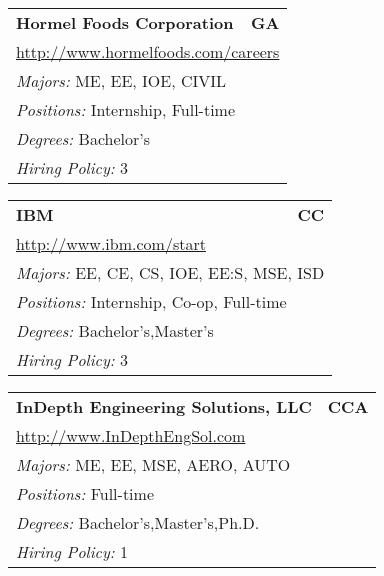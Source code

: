\documentclass[twoside]{article}
\begin{document}
\begin{center}
\begin{multicols}{3}
\begin{FlushLeft}
\begin{minipage}{\columnwidth}
\end{minipage}
 
\begin{minipage}{\columnwidth}\begin{tabularx}{.95\columnwidth}{Xr}
                 {\Large\bf Hormel Foods Corporation} & {\Large\bf GA}\\
    \multicolumn{2}{p{.95\columnwidth}}{\url{http://www.hormelfoods.com/careers}}\\
    \multicolumn{2}{p{.95\columnwidth}}{\emph{Majors:} ME, EE, IOE, CIVIL}\\
    \multicolumn{2}{p{.95\columnwidth}}{\emph{Positions:} Internship, Full-time}\\
    \multicolumn{2}{p{.95\columnwidth}}{\emph{Degrees:} Bachelor's}\\
    \multicolumn{2}{p{.95\columnwidth}}{\emph{Hiring Policy:} 3}\\
    \end{tabularx}
    
\end{minipage}
 
\begin{minipage}{\columnwidth}\begin{tabularx}{.95\columnwidth}{Xr}
                 {\Large\bf IBM} & {\Large\bf CC}\\
    \multicolumn{2}{p{.95\columnwidth}}{\url{http://www.ibm.com/start}}\\
    \multicolumn{2}{p{.95\columnwidth}}{\emph{Majors:} EE, CE, CS, IOE, EE:S, MSE, ISD}\\
    \multicolumn{2}{p{.95\columnwidth}}{\emph{Positions:} Internship, Co-op, Full-time}\\
    \multicolumn{2}{p{.95\columnwidth}}{\emph{Degrees:} Bachelor's,Master's}\\
    \multicolumn{2}{p{.95\columnwidth}}{\emph{Hiring Policy:} 3}\\
    \end{tabularx}
    
\end{minipage}
 
\begin{minipage}{\columnwidth}\begin{tabularx}{.95\columnwidth}{Xr}
                 {\Large\bf InDepth Engineering Solutions, LLC} & {\Large\bf CCA}\\
    \multicolumn{2}{p{.95\columnwidth}}{\url{http://www.InDepthEngSol.com}}\\
    \multicolumn{2}{p{.95\columnwidth}}{\emph{Majors:} ME, EE, MSE, AERO, AUTO}\\
    \multicolumn{2}{p{.95\columnwidth}}{\emph{Positions:} Full-time}\\
    \multicolumn{2}{p{.95\columnwidth}}{\emph{Degrees:} Bachelor's,Master's,Ph.D.}\\
    \multicolumn{2}{p{.95\columnwidth}}{\emph{Hiring Policy:} 1}\\
    \end{tabularx}
    

\end{minipage}
\end{FlushLeft}
\end{multicols}
\end{center}
\end{document}
